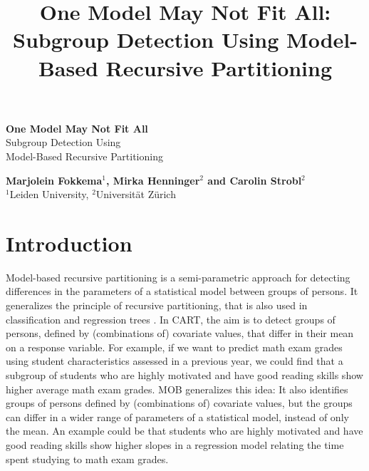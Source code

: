 \documentclass[doc,floatsintext,natbib]{apa7}
\title{One Model May Not Fit All: Subgroup Detection Using Model-Based Recursive Partitioning}
\begin{document}

\renewenvironment{Schunk}{\small}{}



\begin{titlepage}
   \begin{center}
       \vspace*{1cm}

       \textbf{\large One Model May Not Fit All}\\

       \vspace{0.5cm}
        \large Subgroup Detection Using\\Model-Based Recursive Partitioning\\
            
       \vspace{1.5cm}

       \textbf{Marjolein Fokkema$^1$, Mirka Henninger$^2$ and Carolin Strobl$^2$}\\
       $^1$Leiden University, $^2$Universit\"at Z\"urich

       \vfill

            
       \vspace{0.8cm}
     

   \end{center}
\end{titlepage}


\maketitle



\newpage
\section{Introduction}
\label{sec:Introduction}

Model-based recursive partitioning \citep[MOB;][]{ZeilyHoth08} is a semi-parametric approach for detecting differences in the parameters of a statistical model between groups of persons. It generalizes the principle of recursive partitioning, that is also used in classification and regression trees \citep[CART; ][]{Breetal:1984}. 
In CART, the aim is to detect groups of persons, defined by (combinations of) covariate values, that differ in their mean on a response variable. For example, if we want to predict math exam grades using student characteristics assessed in a previous year, we could find that a subgroup of students who are highly motivated and have good reading skills show higher average math exam grades. 
MOB generalizes this idea: It also identifies groups of persons defined by (combinations of) covariate values, but the groups can differ in a wider range of parameters of a statistical model, instead of only the mean. An example could be that students who are highly motivated and have good reading skills show higher slopes in a regression model relating the time spent studying to math exam grades. 
\end{document}
